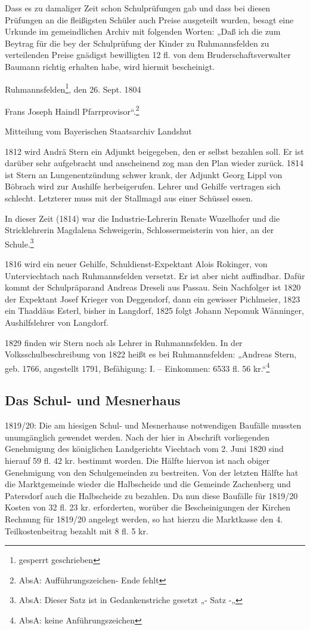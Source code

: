 \documentclass[12pt,a4paper]{book}
\begin{document}
Dass es zu damaliger Zeit schon Schulprüfungen gab und dass bei diesen
Prüfungen an die fleißigsten Schüler auch Preise ausgeteilt wurden,
besagt eine Urkunde im gemeindlichen Archiv mit folgenden Worten: „Daß
ich die zum Beytrag für die bey der Schulprüfung der Kinder zu
Ruhmannsfelden zu verteilenden Preise gnädigst bewilligten 12 fl. von
dem Bruderschaftsverwalter Baumann richtig erhalten habe, wird hiermit
bescheinigt.

Ruhmannsfelden\footnote{gesperrt geschrieben}, den 26. Sept. 1804

Frans Joseph Haindl Pfarrprovisor“.\footnote{AbsA: Aufführungszeichen-
Ende fehlt}

Mitteilung vom Bayerischen Staatsarchiv Landshut

1812 wird Andrä Stern ein Adjunkt beigegeben, den er selbst bezahlen
soll. Er ist darüber sehr aufgebracht und anscheinend zog man den Plan
wieder zurück. 1814 ist Stern an Lungenentzündung schwer krank, der
Adjunkt Georg Lippl von Böbrach wird zur Aushilfe herbeigerufen. Lehrer
und Gehilfe vertragen sich schlecht. Letzterer muss mit der Stallmagd
aus einer Schüssel essen.

In dieser Zeit (1814) war die Industrie-Lehrerin Renate Wuzelhofer und
die Stricklehrerin Magdalena Schweigerin, Schlossermeisterin von hier,
an der Schule.\footnote{AbsA: Dieser Satz ist in Gedankenstriche gesetzt
„- Satz -„}

1816 wird ein neuer Gehilfe, Schuldienst-Expektant Alois Rokinger, von
Unterviechtach nach Ruhmannsfelden versetzt. Er ist aber nicht
auffindbar. Dafür kommt der Schulpräparand Andreas Dreseli aus Passau.
Sein Nachfolger ist 1820 der Expektant Josef Krieger von Deggendorf,
dann ein gewisser Pichlmeier, 1823 ein Thaddäus Esterl, bisher in
Langdorf, 1825 folgt Johann Nepomuk Wänninger, Aushilfslehrer von
Langdorf.

1829 finden wir Stern noch als Lehrer in Ruhmannsfelden. In der
Volksschulbeschreibung von 1822 heißt es bei Ruhmannsfelden: „Andreas
Stern, geb. 1766, angestellt 1791, Befähigung: I. – Einkommen: 6533 fl.
56 kr.“\footnote{AbsA: keine Anführungszeichen}

\subsection[Das Schul- und Mesnerhaus]{Das Schul- und
Mesnerhaus\protect\footnotemark{}\protect{}}

1819/20: Die am hiesigen Schul- und Mesnerhause notwendigen Baufälle
mussten unumgänglich gewendet werden. Nach der hier in Abschrift
vorliegenden Genehmigung des königlichen Landgerichts Viechtach vom 2.
Juni 1820 sind hierauf 59 fl. 42 kr. bestimmt worden. Die Hälfte hiervon
ist nach obiger Genehmigung von den Schulgemeinden zu bestreiten. Von
der letzten Hälfte hat die Marktgemeinde wieder die Halbscheide und die
Gemeinde Zachenberg und Patersdorf auch die Halbscheide zu bezahlen. Da
nun diese Baufälle für 1819/20 Kosten von 32 fl. 23 kr. erforderten,
worüber die Bescheinigungen der Kirchen Rechnung für 1819/20 angelegt
werden, so hat hierzu die Marktkasse den 4. Teilkostenbeitrag bezahlt
mit 8 fl. 5 kr.
\end{document}
